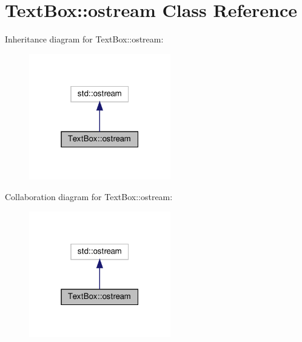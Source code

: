 \hypertarget{a00024}{}\section{Text\+Box\+:\+:ostream Class Reference}
\label{a00024}


Inheritance diagram for Text\+Box\+:\+:ostream\+:\nopagebreak
\begin{figure}[H]
\begin{center}
\leavevmode
\includegraphics[width=175pt]{a00023}
\end{center}
\end{figure}


Collaboration diagram for Text\+Box\+:\+:ostream\+:\nopagebreak
\begin{figure}[H]
\begin{center}
\leavevmode
\includegraphics[width=175pt]{a00022}
\end{center}
\end{figure}
